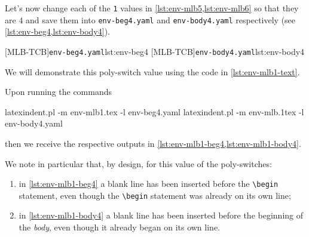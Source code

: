   \begin{example}
  Let's now change each of the \texttt{1} values in \cref{lst:env-mlb5,lst:env-mlb6} so
  that they are $4$ and save them into \texttt{env-beg4.yaml} and \texttt{env-body4.yaml}
  respectively (see \cref{lst:env-beg4,lst:env-body4}).   %

  \begin{cmhtcbraster}
   [MLB-TCB]{\texttt{env-beg4.yaml}}{lst:env-beg4}
   [MLB-TCB]{\texttt{env-body4.yaml}}{lst:env-body4}
  \end{cmhtcbraster}

  We will demonstrate this poly-switch value using the code in \cref{lst:env-mlb1-text}.


  Upon running the commands  

  \begin{commandshell}
latexindent.pl -m env-mlb1.tex -l env-beg4.yaml
latexindent.pl -m env-mlb.1tex -l env-body4.yaml
\end{commandshell}

  then we receive the respective outputs in \cref{lst:env-mlb1-beg4,lst:env-mlb1-body4}.

  \begin{cmhtcbraster}[raster column skip=.1\linewidth]
  \end{cmhtcbraster}

  We note in particular that, by design, for this value of the poly-switches:
  \begin{enumerate}
   \item in \cref{lst:env-mlb1-beg4} a blank line has been inserted before the
         \lstinline!\begin! statement, even though the \lstinline!\begin! statement was
         already on its own line;
   \item in \cref{lst:env-mlb1-body4} a blank line has been inserted before the beginning
         of the \emph{body}, even though it already began on its own line.
  \end{enumerate}
  \end{example}

